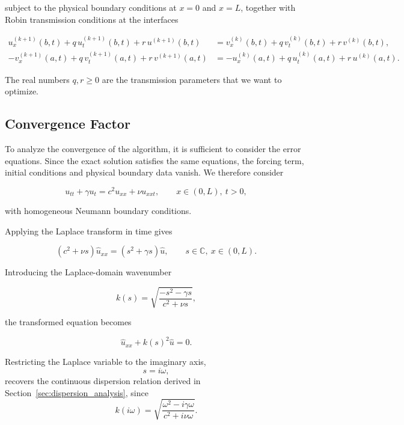 \documentclass{Configuration_Files/PoliMi3i_thesis}
\begin{document}
subject to the physical boundary conditions at $x=0$ and $x=L$, together with Robin transmission conditions at the interfaces

\begin{align*}
u_x^{(k+1)}(b,t)
+
q\,u_t^{(k+1)}(b,t)
+
r\,u^{(k+1)}(b,t)
&=
v_x^{(k)}(b,t)
+
q\,v_t^{(k)}(b,t)
+
r\,v^{(k)}(b,t),
\\
-v_x^{(k+1)}(a,t)
+
q\,v_t^{(k+1)}(a,t)
+
r\,v^{(k+1)}(a,t)
&=
-u_x^{(k)}(a,t)
+
q\,u_t^{(k)}(a,t)
+
r\,u^{(k)}(a,t).
\end{align*}

The real numbers $q,r\ge0$ are the transmission parameters that we want to optimize.

\subsection{Convergence Factor}

To analyze the convergence of the algorithm, it is sufficient to consider the error equations. Since the exact solution satisfies the same equations, the forcing term, initial conditions and physical boundary data vanish. We therefore consider

\begin{equation*}
u_{tt}
+\gamma u_t
=
c^2u_{xx}
+\nu u_{xxt}, \qquad x \in (0,L), \ t > 0,
\end{equation*}

with homogeneous Neumann boundary conditions.

Applying the Laplace transform in time gives

\begin{equation*}
(c^2+\nu s)\widehat{u}_{xx}
=
(s^2+\gamma s)\widehat{u}, \qquad s \in \mathbb{C}, \ x \in (0,L).
\end{equation*}

Introducing the Laplace-domain wavenumber

\begin{equation*}
k(s)
=
\sqrt{
\frac{-s^2-\gamma s}
     {c^2+\nu s}
},
\end{equation*}

the transformed equation becomes

\begin{equation*}
\widehat{u}_{xx}
+
k(s)^2
\widehat{u}
=
0.
\end{equation*}

Restricting the Laplace variable to the imaginary axis,
\[
s=i\omega,
\]
recovers the continuous dispersion relation derived in
Section~\ref{sec:dispersion_analysis}, since
\[
k(i\omega)
=
\sqrt{
\frac{\omega^2-i\gamma\omega}
     {c^2+i\nu\omega}
}.
\]
\end{document}
